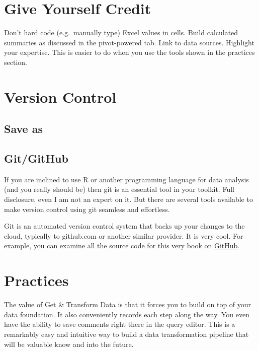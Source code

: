 \documentclass[]{book}
\begin{document}
\hypertarget{give-yourself-credit}{%
\section{Give Yourself Credit}\label{give-yourself-credit}}

Don't hard code (e.g.~manually type) Excel values in cells. Build calculated summaries as discussed in the pivot-powered tab. Link to data sources. Highlight your expertise. This is easier to do when you use the tools shown in the practices section.

\hypertarget{version-control}{%
\section{Version Control}\label{version-control}}

\hypertarget{save-as}{%
\subsection{Save as}\label{save-as}}

\hypertarget{gitgithub}{%
\subsection{Git/GitHub}\label{gitgithub}}

If you are inclined to use R or another programming language for data analysis (and you really should be) then git is an essential tool in your toolkit. Full disclosure, even I am not an expert on it. But there are several tools available to make version control using git seamless and effortless.

Git is an automated version control system that backs up your changes to the cloud, typically to github.com or another similar provider. It is very cool. For example, you can examine all the source code for this very book on \href{https://github.com/nemethc/dataisfordemocracy/tree/master/doingdemocraticdataanalysis}{GitHub}.

\hypertarget{practices-1}{%
\section{Practices}\label{practices-1}}

The value of Get \& Transform Data is that it forces you to build on top of your data foundation. It also conveniently records each step along the way. You even have the ability to save comments right there in the query editor. This is a remarkably easy and intuitive way to build a data transformation pipeline that will be valuable know and into the future.
\end{document}
